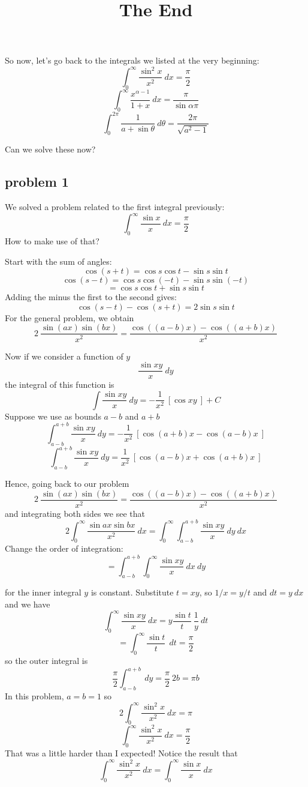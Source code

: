 \documentclass[11pt, oneside]{article}   	%
\title{The End}
\date{}							%
\begin{document}
\maketitle
\Large
So now, let's go back to the integrals we listed at the very beginning:
\[ \int_0^{\infty} \frac{\sin^2 x}{x^2} \ dx = \frac{\pi}{2} \]
\[ \int_0^{\infty} \frac{x^{\alpha - 1}}{1 + x} \ dx = \frac{\pi}{\sin \alpha \pi} \]
\[ \int_0^{2 \pi} \frac{1}{a + \sin \theta} \ d \theta = \frac{2 \pi}{\sqrt{a^2 - 1}} \]

Can we solve these now?  
\subsection*{problem 1}
We solved a problem related to the first integral previously:
\[ \int_0^{\infty} \frac{\sin x}{x} \ dx = \frac{\pi}{2} \]
How to make use of that?

Start with the sum of angles:
\[ \cos (s+t) = \cos s \cos t - \sin s \sin t \]
\[ \cos (s-t) = \cos s \cos (-t) - \sin s \sin (-t) \]
\[ = \cos s \cos t + \sin s \sin t \]
Adding the minus the first to the second gives:
\[ \cos (s-t) - \cos(s+t) = 2 \sin s \sin t \]
For the general problem, we obtain
\[ 2 \ \frac{\sin(ax) \sin(bx)}{x^2} =  \frac{\cos ((a-b)x) - \cos((a+b)x) }{x^2}  \]

Now if we consider a function of $y$
\[ \frac{\sin x y}{x} \ dy \]
the integral of this function is
\[ \int \frac{\sin x y}{x} \ dy = -\frac{1}{x^2} \ [ \cos x y \ ] + C \]
Suppose we use as bounds $a-b$ and $a+b$
\[ \int_{a-b}^{a+b} \frac{\sin x y}{x} \ dy = -\frac{1}{x^2} \ [ \cos (a+b) x  - \cos(a-b) x \ ] \]
\[  \int_{a-b}^{a+b} \frac{\sin x y}{x} \ dy = \frac{1}{x^2} \ [ \cos (a-b) x  + \cos(a+b) x \ ] \]

Hence, going back to our problem
\[ 2 \ \frac{\sin(ax) \sin(bx)}{x^2} =  \frac{\cos ((a-b)x) - \cos((a+b)x) }{x^2}  \]
and integrating both sides we see that
\[ 2 \int_0^{\infty} \frac{\sin ax \sin bx}{x^2} \ dx = \int_0^{\infty} \int_{a-b}^{a+b} \frac{\sin x y}{x} \ dy  \ dx \]
Change the order of integration:
\[ = \int_{a-b}^{a+b} \int_0^{\infty} \frac{\sin x y}{x} \ dx  \ dy \]

for the inner integral $y$ is constant.  Substitute $t = xy$, so $1/x = y/t$ and $dt = y \ dx$ and we have
\[ \int_0^{\infty} \frac{\sin x y}{x} \ dx = y \frac{\sin t}{t} \ \frac{1}{y} \ dt \]
\[ = \int_0^{\infty}  \frac{\sin t}{t} \ \ dt = \frac{\pi}{2} \]
so the outer integral is
\[ \frac{\pi}{2} \int_{a-b}^{a+b}  \ dy = \frac{\pi}{2} \ 2b = \pi b \]
In this problem, $a = b = 1$ so
\[ 2 \int_0^{\infty} \frac{\sin^2 x}{x^2} \ dx = \pi \]
\[ \int_0^{\infty} \frac{\sin^2 x}{x^2} \ dx = \frac{\pi}{2} \]
That was a little harder than I expected!  Notice the result that
\[ \int_0^{\infty} \frac{\sin^2 x}{x^2} \ dx = \int_0^{\infty} \frac{\sin x}{x} \ dx  \]
\end{document}
